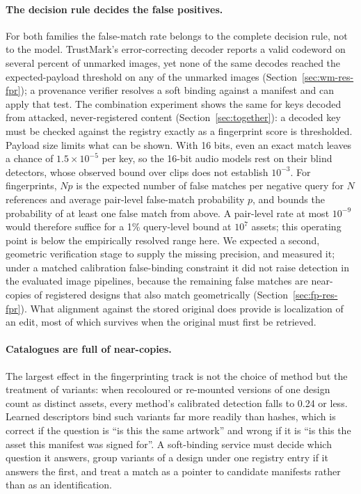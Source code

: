\paragraph{The decision rule decides the false positives.} For both families the false-match rate belongs to the complete decision rule, not to the model. TrustMark's error-correcting decoder reports a valid codeword on several percent of unmarked images, yet none of the same decodes reached the expected-payload threshold on any of the  unmarked images (Section~\ref{sec:wm-res-fpr}); a provenance verifier resolves a soft binding against a manifest and can apply that test. The combination experiment shows the same for keys decoded from attacked, never-registered content (Section~\ref{sec:together}): a decoded key must be checked against the registry exactly as a fingerprint score is thresholded. Payload size limits what can be shown. With 16 bits, even an exact match leaves a chance of $1.5\times10^{-5}$ per key, so the 16-bit audio models rest on their blind detectors, whose observed bound over  clips does not establish $10^{-3}$. For fingerprints, $Np$ is the expected number of false matches per negative query for $N$ references and average pair-level false-match probability $p$, and bounds the probability of at least one false match from above. A pair-level rate at most $10^{-9}$ would therefore suffice for a 1\% query-level bound at $10^{7}$ assets; this operating point is below the empirically resolved range here. We expected a second, geometric verification stage to supply the missing precision, and measured it; under a matched calibration false-binding constraint it did not raise detection in the evaluated image pipelines, because the remaining false matches are near-copies of registered designs that also match geometrically (Section~\ref{sec:fp-res-fpr}). What alignment against the stored original does provide is localization of an edit, most of which survives when the original must first be retrieved.

\paragraph{Catalogues are full of near-copies.} The largest effect in the fingerprinting track is not the choice of method but the treatment of variants: when recoloured or re-mounted versions of one design count as distinct assets, every method's calibrated detection falls to 0.24 or less. Learned descriptors bind such variants far more readily than hashes, which is correct if the question is ``is this the same artwork'' and wrong if it is ``is this the asset this manifest was signed for''. A soft-binding service must decide which question it answers, group variants of a design under one registry entry if it answers the first, and treat a match as a pointer to candidate manifests rather than as an identification.

